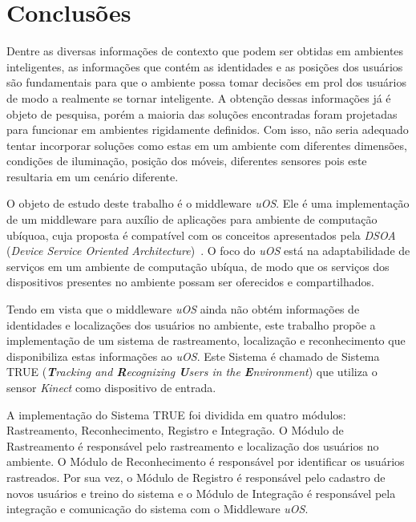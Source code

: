 \chapter{Conclusões}
\label{cap:conclusao}




Dentre as diversas informações de contexto que podem ser obtidas em ambientes inteligentes, as informações que contém as identidades e as posições dos usuários são fundamentais para que o ambiente possa tomar decisões em prol dos usuários de modo a realmente se tornar inteligente. A obtenção dessas informações já é objeto de pesquisa, porém a maioria das soluções encontradas foram projetadas para funcionar em ambientes rigidamente definidos. Com isso, não seria adequado tentar incorporar soluções como estas em um ambiente com diferentes dimensões, condições de iluminação, posição dos móveis, diferentes sensores pois este resultaria em um cenário diferente.

O objeto de estudo deste trabalho é o middleware \textit{uOS}. Ele é uma implementação de um middleware para auxílio de aplicações para ambiente de computação ubíquoa, cuja proposta é compatível com os conceitos apresentados pela \textit{DSOA} (\textit{Device Service Oriented Architecture})~\cite{fabriciobuzzeto}. O foco do \textit{uOS} está na adaptabilidade de serviços em um ambiente de computação ubíqua, de modo que os serviços dos dispositivos presentes no ambiente possam ser oferecidos e compartilhados.

Tendo em vista que o middleware \textit{uOS} ainda não obtém informações de identidades e localizações dos usuários no ambiente, este
trabalho propõe a implementação de um sistema de rastreamento, localização e reconhecimento que disponibiliza estas informações ao \textit{uOS}. Este Sistema é chamado de Sistema TRUE (\textit{\textbf{T}racking and \textbf{R}ecognizing \textbf{U}sers in the \textbf{E}nvironment}) que utiliza o sensor \textit{Kinect} como dispositivo de entrada. 

A implementação do Sistema TRUE foi dividida em  quatro módulos: Rastreamento, Reconhecimento, Registro e Integração. O Módulo de Rastreamento é responsável pelo rastreamento e localização dos usuários no ambiente. O Módulo de Reconhecimento é responsável por identificar os usuários rastreados. Por sua vez, o Módulo de Registro é responsável pelo cadastro de novos usuários e treino do sistema e o Módulo de Integração é responsável pela integração e comunicação do sistema com o Middleware \textit{uOS}.

